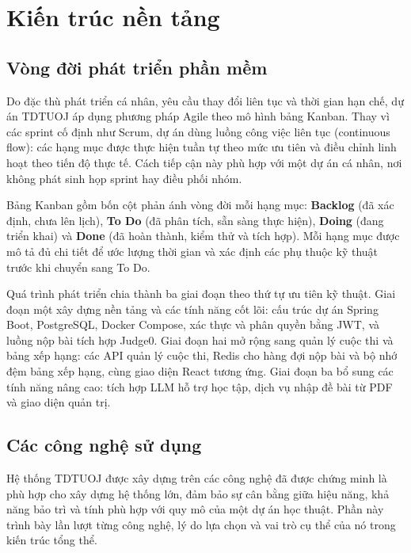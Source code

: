 \documentclass[12pt, a4paper]{report}
\begin{document}
\chapter{Kiến trúc nền tảng}

\section{Vòng đời phát triển phần mềm}

Do đặc thù phát triển cá nhân, yêu cầu thay đổi liên tục và thời gian hạn chế, dự án
TDTUOJ áp dụng phương pháp Agile theo mô hình bảng Kanban. Thay vì các sprint cố
định như Scrum, dự án dùng luồng công việc liên tục (continuous flow): các hạng mục được
thực hiện tuần tự theo mức ưu tiên và điều chỉnh linh hoạt theo tiến độ thực tế. Cách tiếp
cận này phù hợp với một dự án cá nhân, nơi không phát sinh họp sprint hay điều phối nhóm.

Bảng Kanban gồm bốn cột phản ánh vòng đời mỗi hạng mục: \textbf{Backlog} (đã xác định,
chưa lên lịch), \textbf{To Do} (đã phân tích, sẵn sàng thực hiện), \textbf{Doing} (đang
triển khai) và \textbf{Done} (đã hoàn thành, kiểm thử và tích
hợp). Mỗi hạng mục được mô tả đủ chi tiết để ước lượng thời gian và xác định các phụ thuộc kỹ
thuật trước khi chuyển sang To Do.

Quá trình phát triển chia thành ba giai đoạn theo thứ tự ưu tiên kỹ thuật. Giai đoạn một
xây dựng nền tảng và các tính năng cốt lõi: cấu trúc dự án Spring Boot, PostgreSQL, Docker
Compose, xác thực và phân quyền bằng \ac{JWT}, và luồng nộp bài tích hợp Judge0. Giai đoạn
hai mở rộng sang quản lý cuộc thi và bảng xếp hạng: các \ac{API} quản lý cuộc thi, Redis
cho hàng đợi nộp bài và bộ nhớ đệm bảng xếp hạng, cùng giao diện React tương ứng. Giai
đoạn ba bổ sung các tính năng nâng cao: tích hợp \ac{LLM} hỗ trợ học tập, dịch vụ nhập đề
bài từ \ac{PDF} và giao diện quản trị.

\section{Các công nghệ sử dụng}

Hệ thống TDTUOJ được xây dựng trên các công nghệ đã được chứng minh là phù hợp cho xây dựng hệ thống lớn,
đảm bảo sự cân bằng giữa hiệu năng, khả năng bảo trì và tính phù hợp với quy mô của một dự
án học thuật. Phần này trình bày lần lượt từng công nghệ, lý do lựa chọn và vai trò cụ thể
của nó trong kiến trúc tổng thể.
\end{document}
